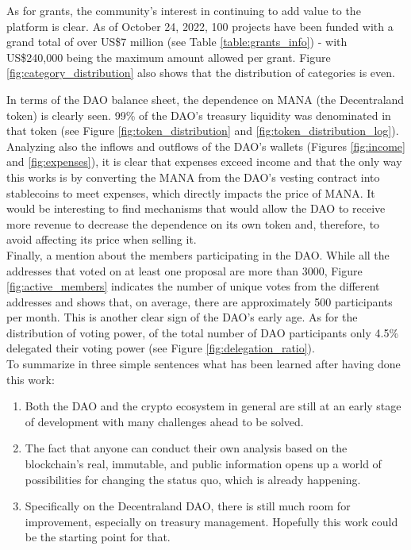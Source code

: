 \documentclass[MSE,Master,english]{twbook}%
\begin{document}
As for grants, the community's interest in continuing to add value to the platform is clear. As of October 24, 2022, 100 projects have been funded with a grand total of over US\$7 million (see Table \ref{table:grants_info}) - with US\$240,000 being the maximum amount allowed per grant. Figure \ref{fig:category_distribution} also shows that the distribution of categories is even.

In terms of the \gls{DAO} balance sheet, the dependence on \gls{MANA} (the Decentraland token) is clearly seen. 99\% of the DAO's treasury liquidity was denominated in that token (see Figure \ref{fig:token_distribution} and \ref{fig:token_distribution_log}). Analyzing also the inflows and outflows of the DAO's wallets (Figures \ref{fig:income} and \ref{fig:expenses}), it is clear that expenses exceed income and that the only way this works is by converting the \gls{MANA} from the DAO's vesting contract into stablecoins to meet expenses, which directly impacts the price of \gls{MANA}. It would be interesting to find mechanisms that would allow the \gls{DAO} to receive more revenue to decrease the dependence on its own token and, therefore, to avoid affecting its price when selling it. \\

Finally, a mention about the members participating in the \gls{DAO}. While all the addresses that voted on at least one proposal are more than 3000, Figure \ref{fig:active_members} indicates the number of unique votes from the different addresses and shows that, on average, there are approximately 500 participants per month. This is another clear sign of the DAO's early age. As for the distribution of voting power, of the total number of \gls{DAO} participants only 4.5\% delegated their voting power (see Figure \ref{fig:delegation_ratio}). \\

To summarize in three simple sentences what has been learned after having done this work:

\begin{enumerate}
  \item Both the \gls{DAO} and the crypto ecosystem in general are still at an early stage of development with many challenges ahead to be solved.
  \item The fact that anyone can conduct their own analysis based on the blockchain's real, immutable, and public information opens up a world of possibilities for changing the status quo, which is already happening.
  \item Specifically on the Decentraland \gls{DAO}, there is still much room for improvement, especially on treasury management. Hopefully this work could be the starting point for that.
\end{enumerate}
\end{document}
